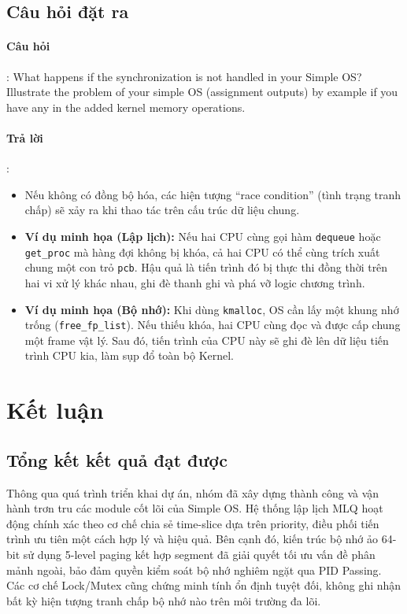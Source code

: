 \documentclass[a4paper]{article}
\begin{document}
\subsection{Câu hỏi đặt ra}
\paragraph{Câu hỏi}: What happens if the synchronization is not handled in your Simple OS? Illustrate the problem of your simple OS (assignment outputs) by example if you have any in the added kernel memory operations.

\paragraph{Trả lời}:
\begin{itemize}
    \item Nếu không có đồng bộ hóa, các hiện tượng ``race condition'' (tình trạng tranh chấp) sẽ xảy ra khi thao tác trên cấu trúc dữ liệu chung.
    \item \textbf{Ví dụ minh họa (Lập lịch):} Nếu hai CPU cùng gọi hàm \texttt{dequeue} hoặc \texttt{get\_proc} mà hàng đợi không bị khóa, cả hai CPU có thể cùng trích xuất chung một con trỏ \texttt{pcb}. Hậu quả là tiến trình đó bị thực thi đồng thời trên hai vi xử lý khác nhau, ghi đè thanh ghi và phá vỡ logic chương trình.
    \item \textbf{Ví dụ minh họa (Bộ nhớ):} Khi dùng \texttt{kmalloc}, OS cần lấy một khung nhớ trống (\texttt{free\_fp\_list}). Nếu thiếu khóa, hai CPU cùng đọc và được cấp chung một frame vật lý. Sau đó, tiến trình của CPU này sẽ ghi đè lên dữ liệu tiến trình CPU kia, làm sụp đổ toàn bộ Kernel.
\end{itemize}

\pagebreak

\section{Kết luận}

\subsection{Tổng kết kết quả đạt được}
Thông qua quá trình triển khai dự án, nhóm đã xây dựng thành công và vận hành trơn tru các module cốt lõi của Simple OS. Hệ thống lập lịch MLQ hoạt động chính xác theo cơ chế chia sẻ time-slice dựa trên priority, điều phối tiến trình ưu tiên một cách hợp lý và hiệu quả. Bên cạnh đó, kiến trúc bộ nhớ ảo 64-bit sử dụng 5-level paging kết hợp segment đã giải quyết tối ưu vấn đề phân mảnh ngoài, bảo đảm quyền kiểm soát bộ nhớ nghiêm ngặt qua PID Passing. Các cơ chế Lock/Mutex cũng chứng minh tính ổn định tuyệt đối, không ghi nhận bất kỳ hiện tượng tranh chấp bộ nhớ nào trên môi trường đa lõi.
\end{document}
